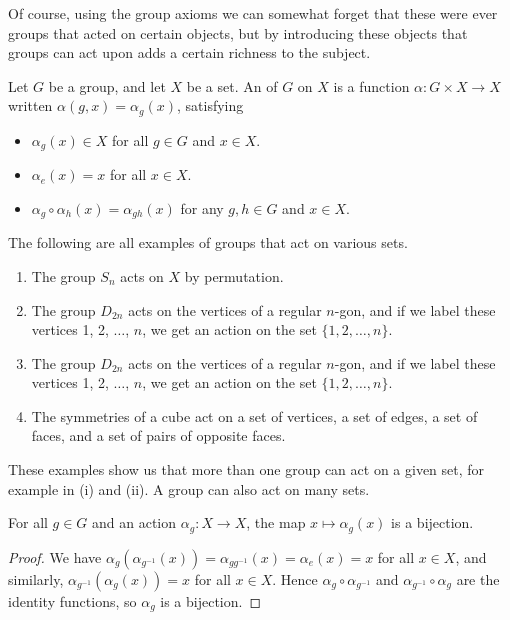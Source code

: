 \documentclass[a4]{scrreprt}
\begin{document}
Of course, using the group axioms we can somewhat forget that these were ever groups that acted on certain objects, but by introducing these objects that groups can act upon adds a certain richness to the subject.

\begin{definition}
Let $G$ be a group, and let $X$ be a set. An  of $G$ on $X$ is a function $\alpha : G \times X \rightarrow X$ written $\alpha(g, x) = \alpha_g(x)$, satisfying
\begin{itemize}
	\item $\alpha_g(x) \in X$ for all $g \in G$ and $x \in X$.
	\item $\alpha_e(x) = x$ for all $x \in X$.
	\item $\alpha_g \circ \alpha_h (x) = \alpha_{gh}(x)$ for any $g, h \in G$ and $x \in X$.
\end{itemize}
\end{definition}

\begin{example}
The following are all examples of groups that act on various sets.
\begin{enumerate}[label=(\roman*)]
	\item The group $S_n$ acts on $X$ by permutation.
	\item The group $D_{2n}$ acts on the vertices of a regular $n$-gon, and if we label these vertices 1, 2, $\dots$, $n$, we get an action on the set $\{1, 2, \dots, n\}$.
	\item The group $D_{2n}$ acts on the vertices of a regular $n$-gon, and if we label these vertices 1, 2, $\dots$, $n$, we get an action on the set $\{1, 2, \dots, n\}$.
	\item The symmetries of a cube act on a set of vertices, a set of edges, a set of faces, and a set of pairs of opposite faces.
\end{enumerate}
\end{example}

\begin{remark}
	These examples show us that more than one group can act on a given set, for example in (i) and (ii). A group can also act on many sets.
\end{remark}

\begin{lemma}\label{lemma:bijection}
	For all $g \in G$ and an action $\alpha_g: X \rightarrow X$, the map $x \mapsto \alpha_g(x)$ is a bijection.
\end{lemma}
\begin{proof}
	We have $\alpha_g(\alpha_{g^{-1}}(x)) = \alpha_{g g^{-1}}(x) = \alpha_e(x) = x$ for all $x \in X$, and similarly, $\alpha_{g^{-1}}(\alpha_g(x)) = x$ for all $x \in X$. Hence $\alpha_g \circ \alpha_{g^{-1}}$ and $\alpha_{g^{-1}} \circ \alpha_{g}$ are the identity functions, so $\alpha_g$ is a bijection.
\end{proof}
\end{document}
